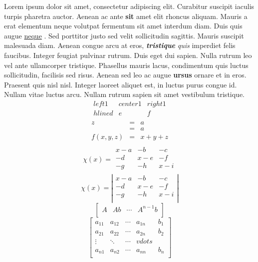 \documentclass[12pt]{article}
\begin{document}
Lorem ipsum dolor sit amet, consectetur adipiscing elit. Curabitur suscipit iaculis turpis pharetra auctor. Aenean ac ante \textbf{sit} 
amet elit rhoncus aliquam. Mauris a erat elementum neque volutpat fermentum sit amet interdum diam. Duis quis augue \underline{neque} .
Sed porttitor justo sed velit sollicitudin sagittis. Mauris suscipit malesuada diam. Aenean congue arcu at eros, \textbf{\textit{tristique}}
\emph{quis} imperdiet felis faucibus. Integer feugiat pulvinar rutrum. Duis eget dui sapien. Nulla rutrum leo vel ante ullamcorper 
tristique. Phasellus mauris lacus, condimentum quis luctus sollicitudin, facilisis sed risus. Aenean sed leo ac augue 
\textbf{ursus} ornare et in eros. Praesent quis nisl nisl. Integer laoreet aliquet est, in luctus purus congue id. Nullam 
vitae luctus arcu. Nullam rutrum sapien sit amet vestibulum tristique.
$$
\begin{array}{|l|cr}
left1 & center 1 & right 1 \\ hline
d & e & f \\
\end{array}
$$
$$
\begin{array}{lll}
z &=& a \\
	&=& a\\
f(x,y,z) &=& x+y+z \\
\end{array}
$$
$$
\chi(x)=
\begin{array}{ccc}
x-a & -b & -c \\
-d & x-e & -f \\
-g & -h & x-i \\
\end{array}
$$
$$
\chi(x)=\left|
\begin{array}{ccc}
x-a & -b & -c \\
-d & x-e & -f \\
-g & -h & x-i \\
\end{array} \right|
$$
$$
\left[
\begin{array}{c|c|c|c}
A & Ab & \cdots & A^{n-1} b\\
\end{array}
\right]
$$
$$
\left[
\begin{array}{cccc|c}
a_{11} & a_{12} & \cdots & a_{1n} & b_1 \\
a_{21} & a_{22} & \cdots & a_{2n} & b_2 \\
\vdots & \ddots & \cdots & vdots &  \\
a_{n1} & a_{n2} & \cdots & a_{nn} & b_n \\
\end{array}
\right]
$$
\end{document}
